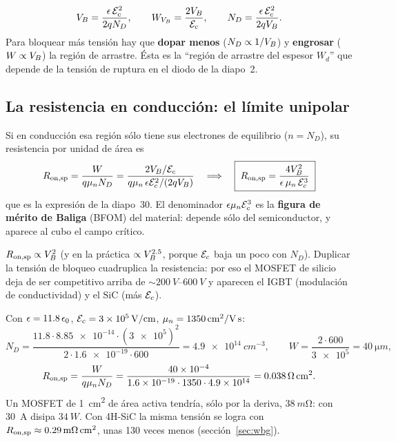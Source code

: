 \begin{clave}
\[
  \VB=\frac{\epsilon\,\Ecr^2}{2qN_D},\qquad
  W_{\VB}=\frac{2\VB}{\Ecr},\qquad
  N_D=\frac{\epsilon\,\Ecr^2}{2q\VB}.
\]
Para bloquear más tensión hay que \textbf{dopar menos} ($N_D\propto1/\VB$) y \textbf{engrosar}
($W\propto\VB$) la región de arrastre. Ésta es la ``región de arrastre del espesor $W_d$'' que
depende de la tensión de ruptura en el diodo de la diapo~2.
\end{clave}

\subsection{La resistencia en conducción: el límite unipolar}

Si en conducción esa región sólo tiene sus electrones de equilibrio ($n=N_D$), su resistencia por
unidad de área es
\[
  \Ronsp=\frac{W}{q\mu_nN_D}
  =\frac{2\VB/\Ecr}{q\mu_n\,\epsilon\Ecr^2/(2q\VB)}
  \quad\Longrightarrow\quad
  \boxed{\;\Ronsp=\frac{4\VB^2}{\epsilon\,\mu_n\,\Ecr^3}\;}
\]
que es la expresión de la diapo~30. El denominador $\epsilon\mu_n\Ecr^3$ es la \textbf{figura de
mérito de Baliga} (BFOM) del material: depende sólo del semiconductor, y aparece al cubo el campo
crítico.

\begin{clave}
$\Ronsp\propto\VB^2$ (y en la práctica $\propto\VB^{2.5}$, porque $\Ecr$ baja un poco con $N_D$).
Duplicar la tensión de bloqueo cuadruplica la resistencia: por eso el MOSFET de silicio deja de ser
competitivo arriba de $\sim\SIrange{200}{600}{V}$ y aparecen el IGBT (modulación de conductividad) y
el SiC (más $\Ecr$).
\end{clave}

\begin{ejemplo}
Con $\epsilon=\epsrSi\,\epsilon_0$, $\Ecr=\EcSi\,\si{V/cm}$, $\mu_n=\munSi\,\si{cm^2/V.s}$:
\[
  N_D=\frac{11.8\cdot\num{8.85e-14}\cdot(\num{3e5})^2}{2\cdot\num{1.6e-19}\cdot600}
  =\SI{4.9e14}{cm^{-3}},\qquad
  W=\frac{2\cdot600}{\num{3e5}}=\SI{40}{\micro m},
\]
\[
  \Ronsp=\frac{W}{q\mu_nN_D}=\frac{\num{40e-4}}{\num{1.6e-19}\cdot1350\cdot\num{4.9e14}}
  =\SI{0.038}{\ohm.cm^2}.
\]
Un MOSFET de \SI{1}{cm^2} de área activa tendría, sólo por la deriva, $\SI{38}{m\ohm}$:
con \SI{30}{A} disipa $\SI{34}{W}$. Con 4H-SiC la misma tensión se logra con
$\Ronsp\approx\SI{0.29}{m\ohm.cm^2}$, unas 130 veces menos (sección~\ref{sec:wbg}).
\end{ejemplo}

